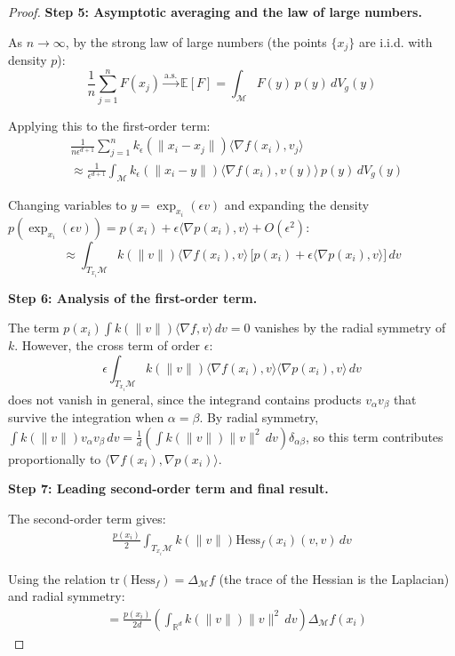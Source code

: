 \begin{proof}
	\textbf{Step 5: Asymptotic averaging and the law of large numbers.}

	As $n \to \infty$, by the strong law of large numbers (the points $\{x_j\}$ are i.i.d. with density $p$):
	\[
		\frac{1}{n} \sum_{j=1}^n F(x_j) \xrightarrow{\text{a.s.}} \mathbb{E}[F] = \int_{\mathcal{M}} F(y) \, p(y) \, dV_g(y)
	\]

	Applying this to the first-order term:
	\begin{align}
		&\frac{1}{n\epsilon^{d+1}} \sum_{j=1}^n k_\epsilon(\|x_i - x_j\|) \langle \nabla f(x_i), v_j \rangle\\
		&\approx \frac{1}{\epsilon^{d+1}} \int_{\mathcal{M}} k_\epsilon(\|x_i - y\|) \langle \nabla f(x_i), v(y) \rangle \, p(y) \, dV_g(y)
	\end{align}

	Changing variables to $y = \exp_{x_i}(\epsilon v)$ and expanding the density $p(\exp_{x_i}(\epsilon v)) = p(x_i) + \epsilon \langle \nabla p(x_i), v \rangle + O(\epsilon^2)$:
	\[
		\approx \int_{T_{x_i}\mathcal{M}} k(\|v\|) \langle \nabla f(x_i), v \rangle \, \bigl[p(x_i) + \epsilon \langle \nabla p(x_i), v \rangle\bigr] \, dv
	\]

	\textbf{Step 6: Analysis of the first-order term.}

	The term $p(x_i) \int k(\|v\|) \langle \nabla f, v \rangle \, dv = 0$ vanishes by the radial symmetry of $k$. However, the cross term of order $\epsilon$:
	\[
		\epsilon \int_{T_{x_i}\mathcal{M}} k(\|v\|) \langle \nabla f(x_i), v \rangle \langle \nabla p(x_i), v \rangle \, dv
	\]
	does not vanish in general, since the integrand contains products $v_\alpha v_\beta$ that survive the integration when $\alpha = \beta$. By radial symmetry, $\int k(\|v\|) v_\alpha v_\beta \, dv = \frac{1}{d}\left(\int k(\|v\|) \|v\|^2 \, dv\right) \delta_{\alpha\beta}$, so this term contributes proportionally to $\langle \nabla f(x_i), \nabla p(x_i) \rangle$.

	\textbf{Step 7: Leading second-order term and final result.}

	The second-order term gives:
	\begin{align}
		\frac{p(x_i)}{2} \int_{T_{x_i}\mathcal{M}} k(\|v\|) \text{Hess}_f(x_i)(v,v) \, dv
	\end{align}

	Using the relation $\text{tr}(\text{Hess}_f) = \Delta_\mathcal{M} f$ (the trace of the Hessian is the Laplacian) and radial symmetry:
	\begin{align}
		&= \frac{p(x_i)}{2d} \left(\int_{\mathbb{R}^d} k(\|v\|) \|v\|^2 \, dv\right) \Delta_\mathcal{M} f(x_i)
	\end{align}


\end{proof}
